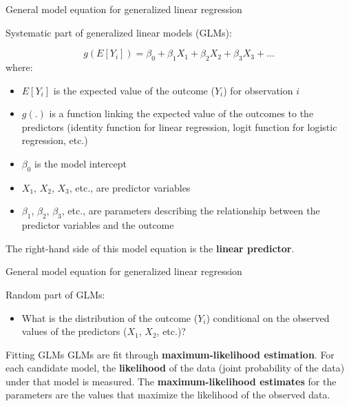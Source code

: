 \documentclass[ignorenonframetext,]{beamer}
\providecommand{\tightlist}{%
  \setlength{\itemsep}{0pt}\setlength{\parskip}{0pt}}
\begin{document}
\begin{frame}{General model equation for generalized linear regression}

Systematic part of generalized linear models (GLMs):

\[ 
g(E[Y_i]) = \beta_0 + \beta_1X_1 + \beta_2X_2 + \beta_3X_3 + ...
\] where:

\begin{itemize}
\tightlist
\item
  \(E[Y_i]\) is the expected value of the outcome (\(Y_i\)) for
  observation \(i\)
\item
  \(g(.)\) is a function linking the expected value of the outcomes to
  the predictors (identity function for linear regression, logit
  function for logistic regression, etc.)
\item
  \(\beta_0\) is the model intercept
\item
  \(X_1\), \(X_2\), \(X_3\), etc., are predictor variables
\item
  \(\beta_1\), \(\beta_2\), \(\beta_3\), etc., are parameters describing
  the relationship between the predictor variables and the outcome
\end{itemize}

The right-hand side of this model equation is the \textbf{linear
predictor}.

\end{frame}

\begin{frame}{General model equation for generalized linear regression}

Random part of GLMs:

\begin{itemize}
\tightlist
\item
  What is the distribution of the outcome (\(Y_i\)) conditional on the
  observed values of the predictors (\(X_1\), \(X_2\), etc.)?
\end{itemize}

\begin{block}{Fitting GLMs}
GLMs are fit through \textbf{maximum-likelihood estimation}. For each candidate model, the \textbf{likelihood} of the data (joint probability of the data) under that model is measured. The \textbf{maximum-likelihood estimates} for the parameters are the values that maximize the likelihood of the observed data. 
\end{block}

\end{frame}
\end{document}
